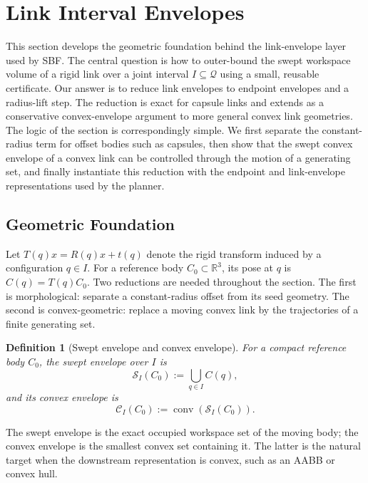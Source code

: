 \documentclass[journal]{IEEEtran}
\DeclareRobustCommand{\textsc}[1]{\textnormal{\MakeUppercase{#1}}}
\newtheorem{definition}{Definition}
\newcommand{\sbf}{\textsc{SBF}}
\newcommand{\Real}{\ensuremath{\mathbb{R}}}
\newcommand{\Q}{\ensuremath{\mathcal{Q}}}
\begin{document}
\section{Link Interval Envelopes}\label{sec:link_envelopes}

This section develops the geometric foundation behind the link-envelope layer
used by \sbf{}. The central question is how to outer-bound the swept workspace
volume of a rigid link over a joint interval $I \subseteq \Q$ using a small,
reusable certificate. Our answer is to reduce link envelopes to endpoint
envelopes and a radius-lift step. The reduction is exact for capsule links and
extends as a conservative convex-envelope argument to more general convex link
geometries. The logic of the section is correspondingly simple. We first
separate the constant-radius term for offset bodies such as capsules, then show
that the swept convex envelope of a convex link can be controlled through the
motion of a generating set, and finally instantiate this reduction with the
endpoint and link-envelope representations used by the planner.

\subsection{Geometric Foundation}\label{sec:rewrite_geom}

Let $T(q)x = R(q)x + t(q)$ denote the rigid transform induced by a
configuration $q \in I$. For a reference body $C_0 \subset \Real^3$, its pose at
$q$ is $C(q)=T(q)C_0$. Two reductions are needed throughout the section. The
first is morphological: separate a constant-radius offset from its seed
geometry. The second is convex-geometric: replace a moving convex link by the
trajectories of a finite generating set.

\begin{definition}[Swept envelope and convex envelope]
For a compact reference body $C_0$, the swept envelope over $I$ is
\[
\mathcal{S}_I(C_0) := \bigcup_{q\in I} C(q),
\]
and its convex envelope is
\[
\mathcal{C}_I(C_0) := \operatorname{conv}(\mathcal{S}_I(C_0)).
\]
\end{definition}

The swept envelope is the exact occupied workspace set of the moving body; the
convex envelope is the smallest convex set containing it. The latter is the
natural target when the downstream representation is convex, such as an AABB or
convex hull.
\end{document}
